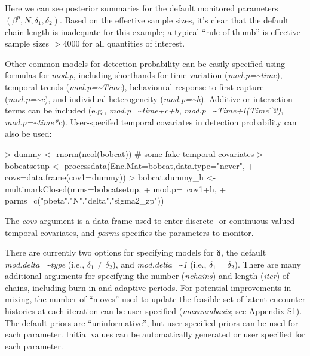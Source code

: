 \documentclass[12pt]{article}
\begin{document}
Here we can see posterior summaries for the default monitored parameters $(\beta^p, N, \delta_1, \delta_2)$. Based on the effective sample sizes, it's clear that the default chain length is inadequate for this example; a typical ``rule of thumb'' is effective sample sizes $>4000$ for all quantities of interest.

Other common models for detection probability can be easily specified using formulas for \textit{mod.p}, including shorthands for time variation (\textit{mod.p={\~{}}time}), temporal trends (\textit{mod.p={\~{}}Time}), behavioural response to first capture (\textit{mod.p={\~{}}c}), and individual heterogeneity (\textit{mod.p={\~{}}h}). Additive or interaction terms can be included (e.g., \textit{mod.p={\~{}}time+c+h}, \textit{mod.p=\~{}Time+I(Time\^{}2)}, \textit{mod.p={\~{}}time*c}). User-specifed temporal covariates in detection probability can also be used: 
\begin{Schunk}
\begin{Sinput}
> dummy <- rnorm(ncol(bobcat)) # some fake temporal covariates
> bobcatsetup <- processdata(Enc.Mat=bobcat,data.type="never",
+                     covs=data.frame(cov1=dummy))
> bobcat.dummy_h <- multimarkClosed(mms=bobcatsetup,
+                     mod.p=~cov1+h,
+                     parms=c("pbeta","N","delta","sigma2_zp"))
\end{Sinput}
\end{Schunk}
The \textit{covs} argument is a data frame used to enter discrete- or continuous-valued temporal covariates, and \textit{parms} specifies the parameters to monitor. 

There are currently two options for specifying models for ${\boldsymbol \delta}$, the default \textit{mod.delta={\~{}}type} (i.e., $\delta_1 \ne \delta_2$), and \textit{mod.delta={\~{}}1} (i.e., $\delta_1 = \delta_2$). There are many additional arguments for specifying the number (\textit{nchains}) and length (\textit{iter}) of chains, including burn-in and adaptive periods. For potential improvements in mixing, the number of ``moves'' used to  update the feasible set of latent encounter histories at each iteration can be user specified (\textit{maxnumbasis}; see Appendix S1). The default priors are ``uninformative'', but user-specified priors can be used for each parameter. Initial values can be automatically generated or user specified for each parameter.
\end{document}
